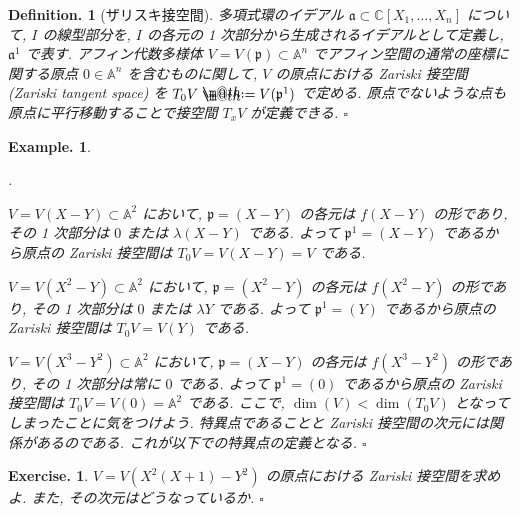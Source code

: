 \documentclass[openany, a4paper, oneside]{jsbook}
\makeatletter
\newcounter{enum2}
\renewenvironment{enumerate}{%
\begin{list}%
{%
\arabic{enum2}.\ \,%
}%
{%
\usecounter{enum2}
\setlength{\itemindent}{0pt}%
\setlength{\leftmargin}{15pt}%
\setlength{\rightmargin}{0pt}%
\setlength{\labelsep}{0pt}%
\setlength{\labelwidth}{6pt}%
\setlength{\itemsep}{0pt}%
\setlength{\parsep}{0pt}%
\setlength{\listparindent}{0pt}%
}
}{%
\end{list}%
}
\newcommand*{\defeq}{\mathrel{\rlap{%
\raisebox{0.3ex}{$\m@th\cdot$}}%
\raisebox{-0.3ex}{$\m@th\cdot$}}%
=}
\theoremstyle{break}
\theoremstyle{breakdefn}
\newtheorem{defn}[thm]{Definition.}
\newtheorem{ex}[thm]{Example.}
\newtheorem{exercise}[thm]{Exercise.}
\newcommand{\fin}{\hfill $\square$ \par}
\makeatother
\begin{document}
\begin{defn}[ザリスキ接空間]
多項式環のイデアル $\mathfrak{a} \subset \mathbb{C}[X_1,\dots,X_n]$ について,
$I$ の線型部分を, $I$ の各元の 1 次部分から生成されるイデアルとして定義し,
$\mathfrak{a}^1$ で表す.
アフィン代数多様体 $V = V (\mathfrak{p}) \subset \mathbb{A}^n$
でアフィン空間の通常の座標に関する原点 $0 \in \mathbb{A}^n$ を含むものに関して,
$V$ の原点における Zariski 接空間 (Zariski tangent space) を
$T_0V \defeq  V (\mathfrak{p}^1)$ で定める.
原点でないような点も原点に平行移動することで接空間 $T_xV$ が定義できる. \fin
\end{defn}
\begin{ex}
\begin{enumerate}
\item $V=V (X-Y) \subset \mathbb{A}^2$ において,
   $\mathfrak{p}=(X-Y)$ の各元は $f (X-Y)$ の形であり,
   その 1 次部分は $0$ または $\lambda (X-Y)$ である.
   よって $\mathfrak{p}^1 = (X-Y)$ であるから原点の Zariski 接空間は $T_0V=V (X-Y)=V$ である.
\item $V=V (X^2-Y) \subset \mathbb{A}^2$ において,
   $\mathfrak{p}=(X^2-Y)$ の各元は $f (X^2-Y)$ の形であり,
   その 1 次部分は $0$ または $\lambda Y$ である.
   よって $\mathfrak{p}^1 = (Y)$ であるから原点の Zariski 接空間は $T_0V=V (Y)$ である.
\item $V=V (X^3-Y^2) \subset \mathbb{A}^2$ において,
   $\mathfrak{p}=(X-Y)$ の各元は $f (X^3-Y^2)$ の形であり,
   その 1 次部分は常に $0$ である.
   よって $\mathfrak{p}^1 = (0)$ であるから原点の Zariski 接空間は $T_0V=V (0)=\mathbb{A}^2$ である.
   ここで, $\dim (V) < \dim (T_0V)$ となってしまったことに気をつけよう.
   特異点であることと Zariski 接空間の次元には関係があるのである.
   これが以下での特異点の定義となる. \fin
\end{enumerate}
\end{ex}
\begin{exercise}
$V=V (X^2 (X+1)-Y^2)$ の原点における Zariski 接空間を求めよ.
また, その次元はどうなっているか. \fin
\end{exercise}
\end{document}
